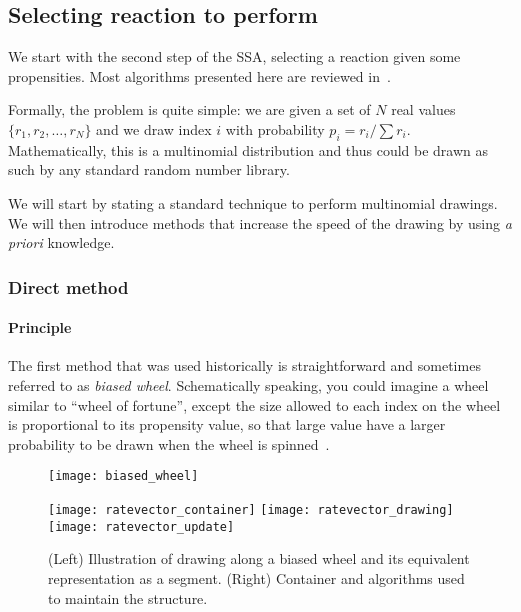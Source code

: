 \subsection{Selecting reaction to perform}
\label{sec:reaction_selection}

We start with the second step of the SSA, selecting a reaction given some propensities.
Most algorithms presented here are reviewed in~\citet{gillespie_perspective:_2013}.

Formally, the problem is quite simple:
we are given a set of $N$ real values $\{ r_1, r_2, \ldots{}, r_N \}$
and we draw index $i$ with probability $p_i = r_i / \sum r_i$.
Mathematically, this is a multinomial distribution and thus could be drawn as such by any standard random number library.

We will start by stating a standard technique to perform multinomial drawings.
We will then introduce methods that increase the speed of the drawing by using \textit {a priori} knowledge.

\subsubsection{Direct method}

\paragraph{Principle}
The first method that was used historically is straightforward
and sometimes referred to as \textit{biased wheel}.
Schematically speaking, you could imagine a wheel similar to ``wheel of fortune'',
except the size allowed to each index on the wheel is proportional to its propensity value,
so that large value have a larger probability to be drawn when the wheel is spinned~.

\begin{figure}[!h]
  \centering
  \begin{minipage}{\textwidth}
    \begin{minipage}{0.5\textwidth}
      \texttt{[image: biased\_wheel]}
    \end{minipage}
    \begin{minipage}{0.5\textwidth}
      \texttt{[image: ratevector\_container]}
      \texttt{[image: ratevector\_drawing]}
      \texttt{[image: ratevector\_update]}
    \end{minipage}
  \end{minipage}
  \caption{(Left) Illustration of drawing along a biased wheel and its equivalent representation as a segment.
  (Right) Container and algorithms used to maintain the structure.}
\label{fig:biased_wheel}
\end{figure}

